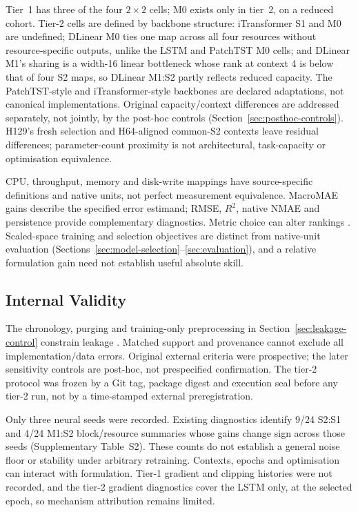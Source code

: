 \documentclass[5p,twocolumn]{elsarticle}
\begin{document}
Tier~1 has three of the four $2\times2$ cells; M0 exists only in tier~2,
on a reduced cohort. Tier-2 cells are defined by backbone structure:
iTransformer S1 and M0 are undefined; DLinear M0 ties one map across all
four resources without resource-specific outputs, unlike the LSTM and
PatchTST M0 cells; and DLinear M1's sharing is a width-16 linear bottleneck
whose rank at context 4 is below that of four S2 maps, so DLinear M1:S2 partly
reflects reduced capacity. The PatchTST-style and iTransformer-style
backbones are declared adaptations, not canonical implementations. Original
capacity/context differences are addressed separately, not jointly, by the
post-hoc controls (Section~\ref{sec:posthoc-controls}). H129's fresh selection
and H64-aligned common-S2 contexts leave residual differences; parameter-count
proximity is not architectural, task-capacity or optimisation equivalence.

CPU, throughput, memory and disk-write mappings have source-specific
definitions and native units, not perfect measurement equivalence.
MacroMAE gains describe the specified error estimand; RMSE, $R^2$, native
NMAE and persistence provide complementary diagnostics. Metric choice can
alter rankings \citep{Hyndman2006Accuracy}. Scaled-space training and selection
objectives are distinct from native-unit evaluation
(Sections~\ref{sec:model-selection}--\ref{sec:evaluation}), and a relative
formulation gain need not establish useful absolute skill.

\subsection{Internal Validity}
\label{sec:threats-internal}

The chronology, purging and training-only preprocessing in
Section~\ref{sec:leakage-control} constrain leakage
\citep{Cerqueira2020Evaluation,Hyndman2021Forecasting}.
Matched support and provenance cannot exclude all implementation/data errors.
Original external criteria were prospective; the later sensitivity controls
are post-hoc, not prespecified confirmation. The tier-2 protocol was frozen
by a Git tag, package digest and execution seal before any tier-2 run, not
by a time-stamped external preregistration.

Only three neural seeds were recorded. Existing diagnostics identify 9/24
S2:S1 and 4/24 M1:S2 block/resource summaries whose gains change sign across
those seeds (Supplementary Table~S2). These counts do not establish a general noise floor or stability
under arbitrary retraining. Contexts, epochs and optimisation can interact
with formulation. Tier-1 gradient and clipping histories were not recorded,
and the tier-2 gradient diagnostics cover the LSTM only, at the selected
epoch, so mechanism attribution remains limited.
\end{document}
